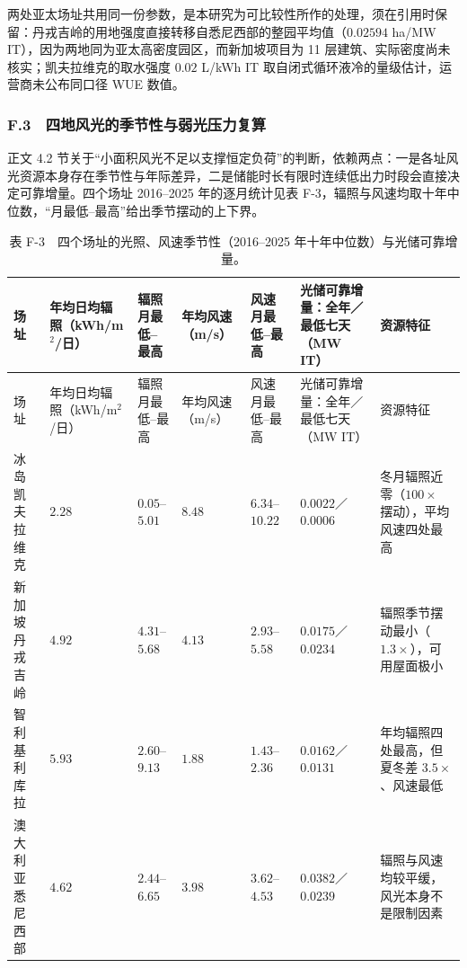 两处亚太场址共用同一份参数，是本研究为可比较性所作的处理，须在引用时保留：丹戎吉岭的用地强度直接转移自悉尼西部的整园平均值（$0.02594$ ha/MW IT），因为两地同为亚太高密度园区，而新加坡项目为 11 层建筑、实际密度尚未核实；凯夫拉维克的取水强度 $0.02$ L/kWh IT 取自闭式循环液冷的量级估计，运营商未公布同口径 WUE 数值。

\subsubsection{F.3　四地风光的季节性与弱光压力复算}

正文 4.2 节关于“小面积风光不足以支撑恒定负荷”的判断，依赖两点：一是各址风光资源本身存在季节性与年际差异，二是储能时长有限时连续低出力时段会直接决定可靠增量。四个场址 2016–2025 年的逐月统计见表 F-3，辐照与风速均取十年中位数，“月最低–最高”给出季节摆动的上下界。

{\footnotesize\setlength{\tabcolsep}{3pt}%
\begin{longtable}{@{}>{\raggedright\arraybackslash}p{}>{\raggedright\arraybackslash}p{}>{\raggedright\arraybackslash}p{}>{\raggedright\arraybackslash}p{}>{\raggedright\arraybackslash}p{}>{\raggedright\arraybackslash}p{}>{\raggedright\arraybackslash}p{}@{}}
\caption{表 F-3　四个场址的光照、风速季节性（2016–2025 年十年中位数）与光储可靠增量。}\label{tab:F-3}\\
\toprule
场址 & 年均日均辐照（kWh/m$^2$/日） & 辐照月最低–最高 & 年均风速（m/s） & 风速月最低–最高 & 光储可靠增量：全年／最低七天（MW IT） & 资源特征 \\
\midrule
\endfirsthead
\toprule
场址 & 年均日均辐照（kWh/m$^2$/日） & 辐照月最低–最高 & 年均风速（m/s） & 风速月最低–最高 & 光储可靠增量：全年／最低七天（MW IT） & 资源特征 \\
\midrule
\endhead
\bottomrule
\endlastfoot
冰岛凯夫拉维克 & $2.28$ & $0.05$–$5.01$ & $8.48$ & $6.34$–$10.22$ & $0.0022$／$0.0006$ & 冬月辐照近零（$100\times$ 摆动），平均风速四处最高 \\
新加坡丹戎吉岭 & $4.92$ & $4.31$–$5.68$ & $4.13$ & $2.93$–$5.58$ & $0.0175$／$0.0234$ & 辐照季节摆动最小（$1.3\times$），可用屋面极小 \\
智利基利库拉 & $5.93$ & $2.60$–$9.13$ & $1.88$ & $1.43$–$2.36$ & $0.0162$／$0.0131$ & 年均辐照四处最高，但夏冬差 $3.5\times$、风速最低 \\
澳大利亚悉尼西部 & $4.62$ & $2.44$–$6.65$ & $3.98$ & $3.62$–$4.53$ & $0.0382$／$0.0239$ & 辐照与风速均较平缓，风光本身不是限制因素 \\
\end{longtable}
}

